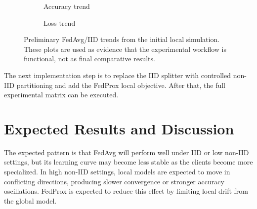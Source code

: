 \documentclass[11pt,a4paper]{article}
\begin{document}
\begin{figure}[H]
\centering
\begin{subfigure}[t]{0.48\textwidth}
\centering
{}
\caption{Accuracy trend}
\end{subfigure}
\hfill
\begin{subfigure}[t]{0.48\textwidth}
\centering
{}
\caption{Loss trend}
\end{subfigure}
\caption{Preliminary FedAvg/IID trends from the initial local simulation. These plots are used as evidence that the experimental workflow is functional, not as final comparative results.}
\label{fig:prelim}
\end{figure}

The next implementation step is to replace the IID splitter with controlled non-IID partitioning and add the FedProx local objective. After that, the full experimental matrix can be executed.

\section{Expected Results and Discussion}

The expected pattern is that FedAvg will perform well under IID or low non-IID settings, but its learning curve may become less stable as the clients become more specialized. In high non-IID settings, local models are expected to move in conflicting directions, producing slower convergence or stronger accuracy oscillations. FedProx is expected to reduce this effect by limiting local drift from the global model.
\end{document}
